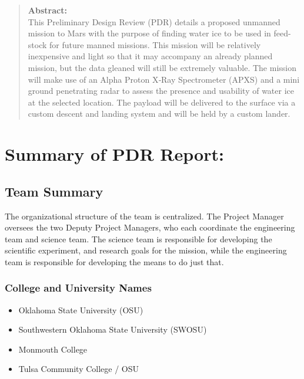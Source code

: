 \documentclass[%
 portrait,
 aapm,
 mph,%
 amsmath,amssymb,
 reprint,%
]{revtex4-2}
\begin{document}
\date{\today}%

\begin{abstract}
\textbf{Abstract:} \\
This Preliminary Design Review (PDR) details a proposed unmanned mission to Mars with the purpose of finding water ice to be used in feed-stock for future manned missions. This mission will be relatively inexpensive and light so that it may accompany an already planned mission, but the data gleaned will still be extremely valuable. The mission will make use of an Alpha Proton X‐Ray Spectrometer (APXS) and a mini ground penetrating radar to assess the presence and usability of water ice at the selected location. The payload will be delivered to the surface via a custom descent and landing system and will be held by a custom lander.
\newpage
%
\end{abstract}

\maketitle



\section{\label{sec:level1}Summary of PDR Report:%
}

\subsection{Team Summary}
The organizational structure of the team is centralized. The Project Manager oversees the two Deputy Project Managers, who each coordinate the engineering team and science team. The science team is responsible for developing the scientific experiment, and research goals for the mission, while the engineering team is responsible for developing the means to do just that. 

\subsubsection{College and University Names}
\begin{itemize}
    \item Oklahoma State University (OSU)
    \item Southwestern Oklahoma State University (SWOSU)
    \item Monmouth College
    \item Tulsa Community College / OSU
\end{itemize}
\end{document}
